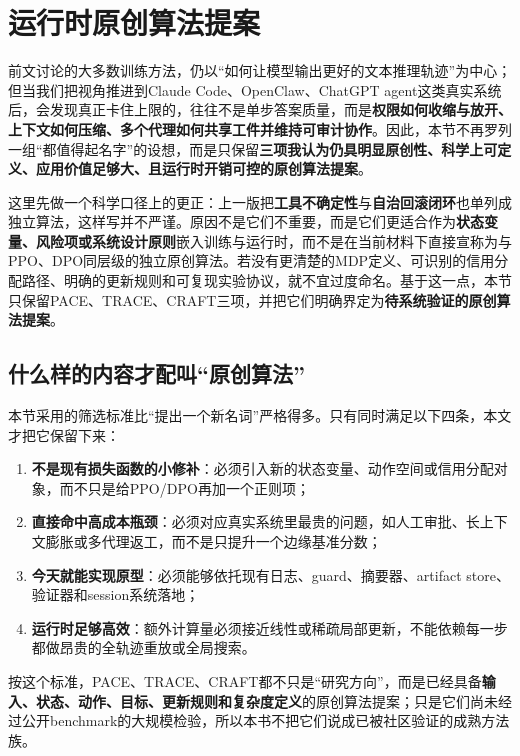 \documentclass[12pt,a4paper]{article}
\begin{document}
\section{运行时原创算法提案}

前文讨论的大多数训练方法，仍以“如何让模型输出更好的文本推理轨迹”为中心；但当我们把视角推进到Claude Code、OpenClaw、ChatGPT agent这类真实系统后，会发现真正卡住上限的，往往不是单步答案质量，而是\textbf{权限如何收缩与放开、上下文如何压缩、多个代理如何共享工件并维持可审计协作}。因此，本节不再罗列一组“都值得起名字”的设想，而是只保留\textbf{三项我认为仍具明显原创性、科学上可定义、应用价值足够大、且运行时开销可控的原创算法提案}。

这里先做一个科学口径上的更正：上一版把\textbf{工具不确定性}与\textbf{自治回滚闭环}也单列成独立算法，这样写并不严谨。原因不是它们不重要，而是它们更适合作为\textbf{状态变量、风险项或系统设计原则}嵌入训练与运行时，而不是在当前材料下直接宣称为与PPO、DPO同层级的独立原创算法。若没有更清楚的MDP定义、可识别的信用分配路径、明确的更新规则和可复现实验协议，就不宜过度命名。基于这一点，本节只保留PACE、TRACE、CRAFT三项，并把它们明确界定为\textbf{待系统验证的原创算法提案}。

\subsection{什么样的内容才配叫“原创算法”}

本节采用的筛选标准比“提出一个新名词”严格得多。只有同时满足以下四条，本文才把它保留下来：

\begin{enumerate}
    \item \textbf{不是现有损失函数的小修补}：必须引入新的状态变量、动作空间或信用分配对象，而不只是给PPO/DPO再加一个正则项；
    \item \textbf{直接命中高成本瓶颈}：必须对应真实系统里最贵的问题，如人工审批、长上下文膨胀或多代理返工，而不是只提升一个边缘基准分数；
    \item \textbf{今天就能实现原型}：必须能够依托现有日志、guard、摘要器、artifact store、验证器和session系统落地；
    \item \textbf{运行时足够高效}：额外计算量必须接近线性或稀疏局部更新，不能依赖每一步都做昂贵的全轨迹重放或全局搜索。
\end{enumerate}

按这个标准，PACE、TRACE、CRAFT都不只是“研究方向”，而是已经具备\textbf{输入、状态、动作、目标、更新规则和复杂度定义}的原创算法提案；只是它们尚未经过公开benchmark的大规模检验，所以本书不把它们说成已被社区验证的成熟方法族。
\end{document}
